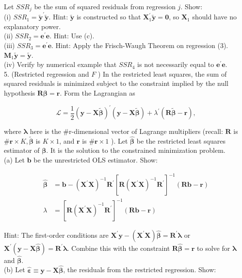 \documentclass[10pt]{article}
\begin{document}
Let $S S R_{j}$ be the sum of squared residuals from regression $j$. Show:\\
(i) $S S R_{1}=\tilde{\mathbf{y}}^{\prime} \tilde{\mathbf{y}}$. Hint: $\tilde{\mathbf{y}}$ is constructed so that $\mathbf{X}_{1}^{\prime} \tilde{\mathbf{y}}=\mathbf{0}$, so $\mathbf{X}_{1}$ should have no explanatory power.\\
(ii) $S S R_{2}=\mathbf{e}^{\prime} \mathbf{e}$. Hint: Use (c).\\
(iii) $S S R_{3}=\mathbf{e}^{\prime} \mathbf{e}$. Hint: Apply the Frisch-Waugh Theorem on regression (3). $\mathbf{M}_{1} \tilde{\mathbf{y}}=\tilde{\mathbf{y}}$.\\
(iv) Verify by numerical example that $S S R_{4}$ is not necessarily equal to $\mathbf{e}^{\prime} \mathbf{e}$.\\
5. (Restricted regression and $F$ ) In the restricted least squares, the sum of squared residuals is minimized subject to the constraint implied by the null hypothesis $\mathbf{R} \boldsymbol{\beta}=\mathbf{r}$. Form the Lagrangian as

$$
\mathcal{L}=\frac{1}{2}(\mathbf{y}-\mathbf{X} \tilde{\boldsymbol{\beta}})^{\prime}(\mathbf{y}-\mathbf{X} \tilde{\boldsymbol{\beta}})+\lambda^{\prime}(\mathbf{R} \tilde{\boldsymbol{\beta}}-\mathbf{r}),
$$

where $\boldsymbol{\lambda}$ here is the \#r-dimensional vector of Lagrange multipliers (recall: $\mathbf{R}$ is $\# \mathbf{r} \times K, \widetilde{\boldsymbol{\beta}}$ is $K \times 1$, and $\mathbf{r}$ is $\# \mathbf{r} \times 1$ ). Let $\widehat{\boldsymbol{\beta}}$ be the restricted least squares estimator of $\boldsymbol{\beta}$. It is the solution to the constrained minimization problem.\\
(a) Let $\mathbf{b}$ be the unrestricted OLS estimator. Show:

$$
\begin{aligned}
\widehat{\boldsymbol{\beta}} & =\mathbf{b}-\left(\mathbf{X}^{\prime} \mathbf{X}\right)^{-1} \mathbf{R}^{\prime}\left[\mathbf{R}\left(\mathbf{X}^{\prime} \mathbf{X}\right)^{-1} \mathbf{R}^{\prime}\right]^{-1}(\mathbf{R} \mathbf{b}-\mathbf{r}) \\
\lambda & =\left[\mathbf{R}\left(\mathbf{X}^{\prime} \mathbf{X}\right)^{-1} \mathbf{R}^{\prime}\right]^{-1}(\mathbf{R} \mathbf{b}-\mathbf{r})
\end{aligned}
$$

Hint: The first-order conditions are $\mathbf{X}^{\prime} \mathbf{y}-\left(\mathbf{X}^{\prime} \mathbf{X}\right) \widehat{\boldsymbol{\beta}}=\mathbf{R}^{\prime} \boldsymbol{\lambda}$ or $\mathbf{X}^{\prime}(\mathbf{y}-\mathbf{X} \widehat{\boldsymbol{\beta}})= \mathbf{R}^{\prime} \boldsymbol{\lambda}$. Combine this with the constraint $\mathbf{R} \widehat{\boldsymbol{\beta}}=\mathbf{r}$ to solve for $\boldsymbol{\lambda}$ and $\widehat{\boldsymbol{\beta}}$.\\
(b) Let $\hat{\boldsymbol{\varepsilon}} \equiv \mathbf{y}-\mathbf{X} \widehat{\boldsymbol{\beta}}$, the residuals from the restricted regression. Show:
\end{document}
